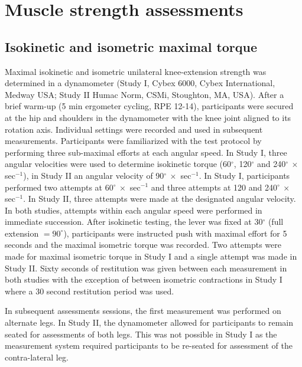 \documentclass[twoside,10pt]{gihclass} %
\begin{document}
\hypertarget{muscle-strength-assessments}{%
\section{Muscle strength assessments}\label{muscle-strength-assessments}}

\hypertarget{isokinetic-and-isometric-maximal-torque}{%
\subsection{Isokinetic and isometric maximal torque}\label{isokinetic-and-isometric-maximal-torque}}

Maximal isokinetic and isometric unilateral knee-extension strength was determined in a dynamometer (Study I, Cybex 6000, Cybex International, Medway USA; Study II Humac Norm, CSMi, Stoughton, MA, USA).
After a brief warm-up (5 min ergometer cycling, RPE 12-14), participants were secured at the hip and shoulders in the dynamometer with the knee joint aligned to its rotation axis.
Individual settings were recorded and used in subsequent measurements.
Participants were familiarized with the test protocol by performing three sub-maximal efforts at each angular speed.
In Study I, three angular velocities were used to determine isokinetic torque (60\(^{\circ}\), 120\(^{\circ}\) and 240\(^{\circ} ~\times\) sec\(^{-1}\)), in Study II an angular velocity of 90\(^{\circ} ~\times\) sec\(^{-1}\).
In Study I, participants performed two attempts at 60\(^{\circ} ~\times\) sec\(^{-1}\) and three attempts at 120 and 240\(^{\circ}~\times\) sec\(^{-1}\).
In Study II, three attempts were made at the designated angular velocity.
In both studies, attempts within each angular speed were performed in immediate succession.
After isokinetic testing, the lever was fixed at 30\(^{\circ}\) (full extension \(=90^{\circ}\)), participants were instructed push with maximal effort for 5 seconds and the maximal isometric torque was recorded.
Two attempts were made for maximal isometric torque in Study I and a single attempt was made in Study II.
Sixty seconds of restitution was given between each measurement in both studies with the exception of between isometric contractions in Study I where a 30 second restitution period was used.

In subsequent assessments sessions, the first measurement was performed on alternate legs.
In Study II, the dynamometer allowed for participants to remain seated for assessments of both legs. This was not possible in Study I as the measurement system required participants to be re-seated for assessment of the contra-lateral leg.
\end{document}
